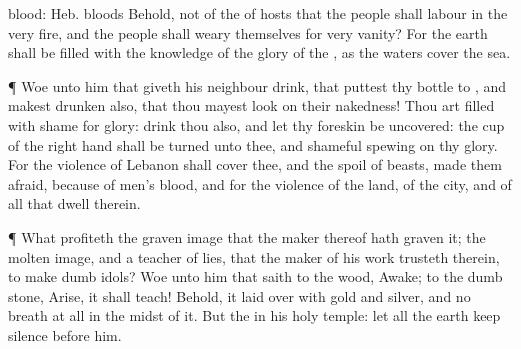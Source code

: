 {{blood: Heb. bloods}
Behold,
{} not of the
{} of
hosts that the
people shall
labour in the
very
fire, and the
people shall
weary themselves for
very
vanity?
For the
earth shall be
filled with the
knowledge of the
glory of the
{}, as the
waters
cover the
sea.
\par }{\PP {}¶
Woe unto him that giveth his
neighbour
drink, that
puttest thy
bottle to
{}, and makest
{}
drunken also, that thou mayest
look on their
nakedness!
Thou art
filled with
shame for
glory:
drink thou also, and let thy foreskin be
uncovered: the
cup of the
{} right
hand shall be
turned unto thee, and shameful
spewing
{} on thy
glory.
For the
violence of
Lebanon shall
cover thee, and the
spoil of
beasts,
{} made them
afraid, because of
men’s
blood, and for the
violence of the
land, of the
city, and of all that
dwell therein.
\par }{\PP {}¶ What
profiteth the graven
image that the
maker thereof hath
graven it; the molten
image, and a
teacher of
lies, that the
maker of his
work
trusteth therein, to
make
dumb
idols?
Woe unto him that
saith to the
wood,
Awake; to the
dumb
stone,
Arise, it shall
teach! Behold, it
{}
laid over with
gold and
silver, and
{} no
breath at all in the
midst of it.
But the
{}
{} in his
holy
temple: let all the
earth keep
silence
before him.

}
